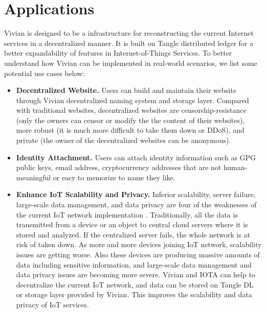 \section{Applications}
\label{sec:application}

Vivian is designed to be a infrastructure for reconstructing the current Internet services in a decentralized manner.
It is built on Tangle distributed ledger for a better expandability of features in Internet-of-Things Services.
To better understand how Vivian can be implemented in real-world scenarios, we list some potential use cases below:

\begin{itemize}
    \item \textbf{Decentralized Website.} Users can build and maintain their website through Vivian decentralized naming system and storage layer.
          Compared with traditional websites, decentralized websites are censorship-resistance (only the owners can censor or modify the the content of their websites),
          more robust (it is much more difficult to take them down or DDoS), and private (the owner of the decentralized websites can be anonymous).
    \item  \textbf{Identity Attachment.} Users can attach identity information such as GPG public keys, email address, cryptocurrency addresses that are not human-meaningful or easy to memorize to name they like.
    \item \textbf{Enhance IoT Scalability and Privacy.} Inferior scalability, server failure, large-scale data management, and data privacy are four of the weaknesses of the current IoT network implementation \cite{farahani2021convergence}.
          Traditionally, all the data is transmitted from a device or an object to central cloud servers where it is stored and analyzed. If the centralized server fails, the whole network is at risk of taken down.
          As more and more devices joining IoT network, scalability issues are getting worse. Also these devices are producing massive amounts of data including sensitive information, and large-scale data management and data privacy issues are becoming more severe.
          Vivian and IOTA can help to decentralize the current IoT network, and data can be stored on Tangle DL or storage layer provided by Vivian. This improves the scalability and data privacy of IoT services.
\end{itemize}

